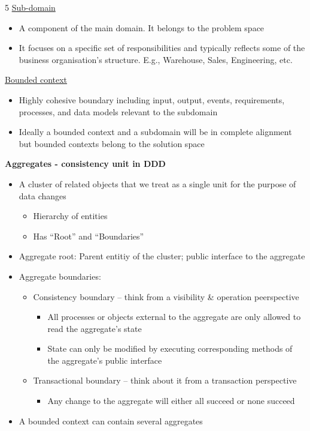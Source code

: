 \documentclass[landscape,a4paper]{extarticle}
\begin{document}
\begin{multicols*}{5}
    \uline{Sub-domain}

    \begin{itemize}
        \item A component of the main domain. It belongs to the problem space
        \item It focuses on a specific set of responsibilities and typically reflects
        some of the business organisation’s structure. E.g., Warehouse, Sales, Engineering, etc.
    \end{itemize}

    \uline{Bounded context}

    \begin{itemize}
        \item Highly cohesive boundary including input, output, events, requirements,
        processes, and data models relevant to the subdomain
        \item Ideally a bounded context and a subdomain will be in complete alignment
        but bounded contexts belong to the solution space
    \end{itemize}

    \textbf{Aggregates - consistency unit in DDD}

    \begin{itemize}
        \item A cluster of related objects that we treat as a single unit for the purpose of data changes
        \begin{itemize}
            \item Hierarchy of entities
            \item Has ``Root'' and ``Boundaries''
        \end{itemize}
        \item Aggregate root: Parent entitiy of the cluster; public interface to the aggregate
        \item Aggregate boundaries:
        \begin{itemize}
            \item Consistency boundary -- think from a visibility \& operation peerspective
            \begin{itemize}
                \item All processes or objects external to the aggregate are only allowed to read
                the aggregate's state
                \item State can only be modified by executing corresponding methods of the aggregate's 
                public interface
            \end{itemize}
            \item Transactional boundary -- think about it from a transaction perspective
            \begin{itemize}
                \item Any change to the aggregate will either all succeed or none succeed
            \end{itemize}
        \end{itemize}
        \item A bounded context can contain several aggregates
    \end{itemize}


\end{multicols*}
\end{document}
